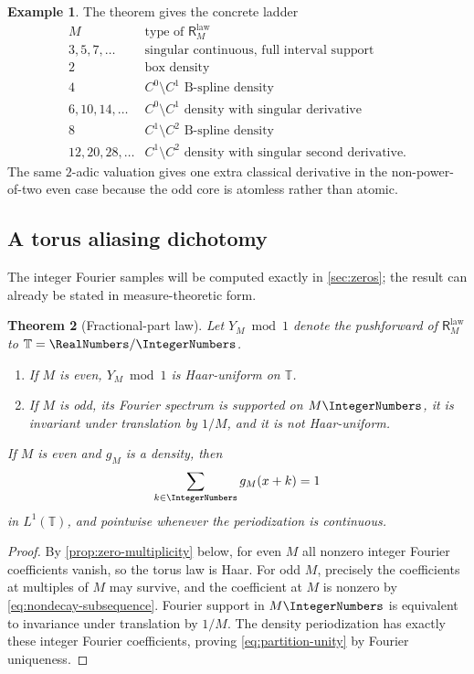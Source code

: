 \documentclass[11pt,oneside]{article}
\newtheorem{theorem}{Theorem}[section]
\theoremstyle{definition}
\newtheorem{example}[theorem]{Example}
\theoremstyle{remark}
\newcommand{\T}{\mathbb T}
\newcommand{\ReciprocalIntegerLaw}[1]{\mathsf R^{\mathrm{law}}_{#1}}
\begin{document}
\begin{example}
The theorem gives the concrete ladder
\[
\begin{array}{c|c}
M&\text{type of }\ReciprocalIntegerLaw{M}\\ \hline
3,5,7,\ldots&\text{singular continuous, full interval support}\\
2&\text{box density}\\
4& C^0\setminus C^1\text{ B-spline density}\\
6,10,14,\ldots& C^0\setminus C^1\text{ density with singular derivative}\\
8& C^1\setminus C^2\text{ B-spline density}\\
12,20,28,\ldots& C^1\setminus C^2\text{ density with singular second derivative}.
\end{array}
\]
The same $2$-adic valuation gives one extra classical derivative in the non-power-of-two
even case because the odd core is atomless rather than atomic.
\end{example}

\subsection{A torus aliasing dichotomy}

The integer Fourier samples will be computed exactly in \cref{sec:zeros}; the result can
already be stated in measure-theoretic form.

\begin{theorem}[Fractional-part law]
\label{thm:torus}
Let $Y_M\bmod1$ denote the pushforward of $\ReciprocalIntegerLaw{M}$ to $\T=\RealNumbers/\IntegerNumbers$.
\begin{enumerate}
\item If $M$ is even, $Y_M\bmod1$ is Haar-uniform on $\T$.
\item If $M$ is odd, its Fourier spectrum is supported on $M\IntegerNumbers$, it is invariant under
translation by $1/M$, and it is not Haar-uniform.
\end{enumerate}
If $M$ is even and $g_M$ is a density, then
\begin{equation}
 \sum_{k\in\IntegerNumbers}g_M(x+k)=1
 \label{eq:partition-unity}
\end{equation}
in $L^1(\T)$, and pointwise whenever the periodization is continuous.
\end{theorem}

\begin{proof}
By \cref{prop:zero-multiplicity} below, for even $M$ all nonzero integer Fourier
coefficients vanish, so the torus law is Haar.  For odd $M$, precisely the coefficients at
multiples of $M$ may survive, and the coefficient at $M$ is nonzero by
\eqref{eq:nondecay-subsequence}.  Fourier support in $M\IntegerNumbers$ is equivalent to invariance
under translation by $1/M$.  The density periodization has exactly these integer Fourier
coefficients, proving \eqref{eq:partition-unity} by Fourier uniqueness.
\end{proof}
\end{document}
